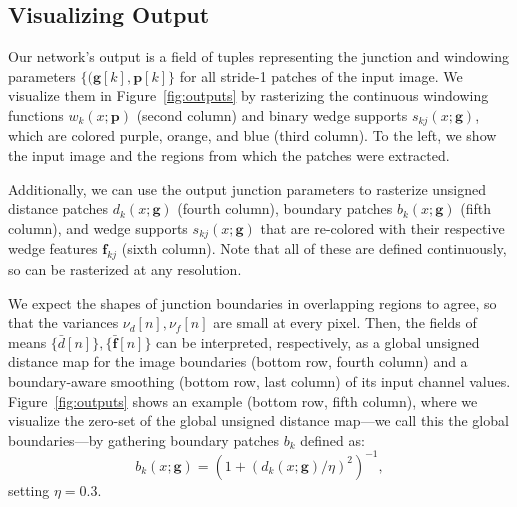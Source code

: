 \documentclass[main.tex]{subfiles}
\begin{document}
\subsection{Visualizing Output}
\label{sec:output}

Our network's output is a field of tuples representing the junction and windowing parameters $\{(\mathbf{g}[k], \mathbf{p}[k]\}$ for all stride-1 patches of the input image. We  visualize them in Figure~\ref{fig:outputs} by rasterizing the continuous windowing functions $w_k(x;\mathbf{p})$ (second column) and binary wedge supports $s_{kj}(x;\mathbf{g})$, which are colored purple, orange, and blue (third column). To the left, we show the input image and the regions from which the patches were extracted.

Additionally, we can use the output junction parameters to rasterize unsigned distance patches $d_k(x;\mathbf{g})$ (fourth column), boundary patches $b_k(x;\mathbf{g})$ (fifth column), and wedge supports  $s_{kj}(x;\mathbf{g})$ that are re-colored with their respective wedge features $\mathbf{f}_{kj}$ (sixth column). Note that all of these are defined continuously, so can be rasterized at any resolution.

We expect the shapes of junction boundaries in overlapping regions to agree, so that the variances $\nu_d[n], \nu_f[n]$ are small at every pixel. Then, the fields of means $\{\bar{d}[n]\}, \{\bar{\mathbf{f}}[n]\}$ can be interpreted, respectively, as a global unsigned distance map for the image boundaries  (bottom row, fourth column) and a boundary-aware smoothing (bottom row, last column) of its input channel values. 
Figure~\ref{fig:outputs} shows an example (bottom row, fifth column), where we visualize the zero-set of the global unsigned distance map---we call this the global boundaries---by gathering boundary patches $b_k$ defined as:
\begin{equation} \label{eq:nonlinearboundary}
    b_k(x;\mathbf{g})=\left(1 + (d_k(x;\mathbf{g})/\eta)^{2}\right)^{-1},
\end{equation}
setting $\eta=0.3$.
\end{document}
